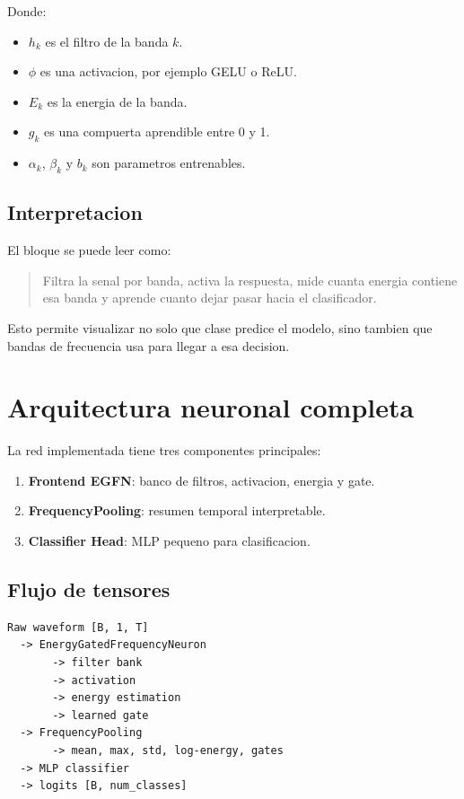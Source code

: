 \documentclass[11pt,letterpaper]{article}
\begin{document}
Donde:

\begin{itemize}[leftmargin=*]
    \item $h_k$ es el filtro de la banda $k$.
    \item $\phi$ es una activacion, por ejemplo GELU o ReLU.
    \item $E_k$ es la energia de la banda.
    \item $g_k$ es una compuerta aprendible entre 0 y 1.
    \item $\alpha_k$, $\beta_k$ y $b_k$ son parametros entrenables.
\end{itemize}

\subsection{Interpretacion}

El bloque se puede leer como:

\begin{quote}
Filtra la senal por banda, activa la respuesta, mide cuanta energia contiene
esa banda y aprende cuanto dejar pasar hacia el clasificador.
\end{quote}

Esto permite visualizar no solo que clase predice el modelo, sino tambien que
bandas de frecuencia usa para llegar a esa decision.

\section{Arquitectura neuronal completa}

La red implementada tiene tres componentes principales:

\begin{enumerate}[leftmargin=*]
    \item \textbf{Frontend EGFN}: banco de filtros, activacion, energia y gate.
    \item \textbf{FrequencyPooling}: resumen temporal interpretable.
    \item \textbf{Classifier Head}: MLP pequeno para clasificacion.
\end{enumerate}

\subsection{Flujo de tensores}

\begin{verbatim}
Raw waveform [B, 1, T]
  -> EnergyGatedFrequencyNeuron
       -> filter bank
       -> activation
       -> energy estimation
       -> learned gate
  -> FrequencyPooling
       -> mean, max, std, log-energy, gates
  -> MLP classifier
  -> logits [B, num_classes]
\end{verbatim}
\end{document}
